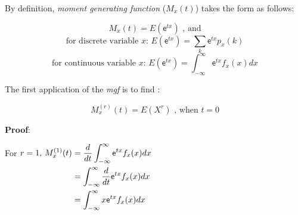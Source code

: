 \documentclass[12pt]{article}
\begin{document}



\setcounter{figure}{0}

\vspace{10pt}

By definition,  \textit{moment generating function} ($M_x (t)$) takes the form as follows:


\begin{tcolorbox} [colback=blue!5!white,  colframe=blue!75!black,  title= {\textbf{Definition} }]

$$ M_x (t) = E( \mathsf{e} ^{tx} ) \text{ ,  and} $$
$$ \text {for discrete variable $x$: }  E( \mathsf{e} ^{tx} ) = \sum_{k} \mathsf{e}^{tx}p_x (k) $$
$$ \text {for continuous variable $x$: } E( \mathsf{e} ^{tx} ) = \int_{-\infty}^{\infty}  \mathsf{e}^{tx}f_x (x)dx $$

\end{tcolorbox}



The first application of the \textit{mgf} is to find :

\begin{tcolorbox} [colback=blue!5!white,  colframe=blue!75!black,  title= {\textbf{Theorem 1} }]

$$ M_x ^{(r)} (t) = E( X^{r} ) \text{ ,  when $t=0$} $$

\end{tcolorbox}

\textbf{Proof}:

For $r=1 \text{,  } 
\begin{aligned}[t]
M_x^{(1)} (t)  
    &= \frac{d}{dt} \int_{-\infty}^{\infty}  \mathsf{e}^{tx}f_x (x)dx\\
    &=\int_{-\infty}^{\infty} \frac{d}{dt}  \mathsf{e}^{tx}f_x (x)dx\\
    &=\int_{-\infty}^{\infty} x  \mathsf{e}^{tx}f_x (x)dx\\
    \end{aligned}\\
$
\\
\end{document}
